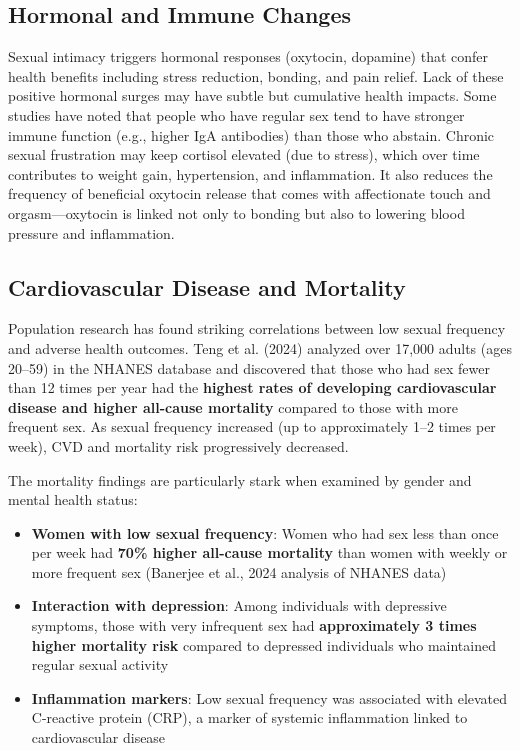 \documentclass[12pt,openany]{book}
\numberwithin{equation}{chapter}
\begin{document}
\subsection{Hormonal and Immune Changes}

Sexual intimacy triggers hormonal responses (oxytocin, dopamine) that confer health benefits including stress reduction, bonding, and pain relief. Lack of these positive hormonal surges may have subtle but cumulative health impacts. Some studies have noted that people who have regular sex tend to have stronger immune function (e.g., higher IgA antibodies) than those who abstain. Chronic sexual frustration may keep cortisol elevated (due to stress), which over time contributes to weight gain, hypertension, and inflammation. It also reduces the frequency of beneficial oxytocin release that comes with affectionate touch and orgasm---oxytocin is linked not only to bonding but also to lowering blood pressure and inflammation.

\subsection{Cardiovascular Disease and Mortality}

Population research has found striking correlations between low sexual frequency and adverse health outcomes. Teng et al. (2024) analyzed over 17,000 adults (ages 20--59) in the NHANES database and discovered that those who had sex fewer than 12 times per year had the \textbf{highest rates of developing cardiovascular disease and higher all-cause mortality} compared to those with more frequent sex. As sexual frequency increased (up to approximately 1--2 times per week), CVD and mortality risk progressively decreased.

The mortality findings are particularly stark when examined by gender and mental health status:

\begin{itemize}
    \item \textbf{Women with low sexual frequency}: Women who had sex less than once per week had \textbf{70\% higher all-cause mortality} than women with weekly or more frequent sex (Banerjee et al., 2024 analysis of NHANES data)
    \item \textbf{Interaction with depression}: Among individuals with depressive symptoms, those with very infrequent sex had \textbf{approximately 3 times higher mortality risk} compared to depressed individuals who maintained regular sexual activity
    \item \textbf{Inflammation markers}: Low sexual frequency was associated with elevated C-reactive protein (CRP), a marker of systemic inflammation linked to cardiovascular disease
\end{itemize}
\end{document}

